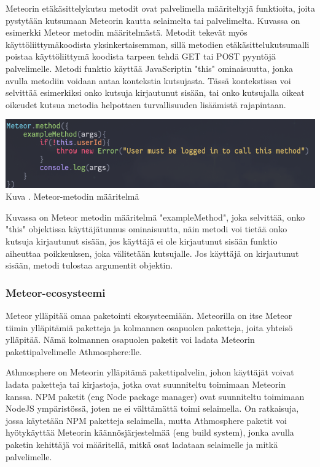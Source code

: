 Meteorin etäkäsittelykutsu metodit ovat palvelimella määriteltyjä funktioita, joita pystytään kutsumaan Meteorin kautta selaimelta tai palvelimelta. 
Kuvassa \nextImageCount{} on esimerkki Meteor metodin määritelmästä.
Metodit tekevät myös käyttöliittymäkoodista yksinkertaisemman, 
sillä metodien etäkäsittelukutsumalli poistaa käyttöliittymä koodista tarpeen tehdä GET tai POST pyyntöjä palvelimelle.
Metodi funktio käyttää JavaScriptin "this"{} ominaisuutta, jonka
avulla metodiin voidaan antaa kontekstia kutsujasta.
Tässä kontekstissa voi selvittää esimerkiksi onko kutsuja kirjautunut sisään, tai onko kutsujalla oikeat oikeudet kutsua metodia helpottaen turvallisuuden lisäämistä rajapintaan.
\bigskip

\includegraphics[width=15cm]{src/public/methodexample.png}\\
Kuva \getImgCount {}. Meteor-metodin määritelmä
\medskip

Kuvassa on Meteor metodin määritelmä "exampleMethod"{}, joka selvittää, onko "this"{} objektissa käyttäjätunnus ominaisuutta, 
näin metodi voi tietää onko kutsuja kirjautunut sisään,
jos käyttäjä ei ole kirjautunut sisään funktio aiheuttaa poikkeuksen, joka välitetään kutsujalle.
Jos käyttäjä on kirjautunut sisään, metodi tulostaa argumentit objektin. 
\medskip




\subsubsection{Meteor-ecosysteemi}



Meteor ylläpitää omaa paketointi ekosysteemiään. 
Meteorilla on itse Meteor tiimin ylläpitämiä paketteja ja kolmannen osapuolen paketteja,
joita yhteisö ylläpitää. Nämä kolmannen osapuolen paketit voi ladata Meteorin pakettipalvelimelle Athmosphere:lle.\\
\medskip


Athmosphere on Meteorin ylläpitämä pakettipalvelin, johon käyttäjät voivat ladata paketteja tai kirjastoja,
jotka ovat suunniteltu toimimaan Meteorin kanssa.
NPM paketit (eng Node package manager) ovat suunniteltu toimimaan NodeJS ympäristössä, joten ne ei välttämättä toimi selaimella.
On ratkaisuja, jossa käytetään NPM paketteja selaimella, mutta
Athmosphere paketit voi hyötykäyttää Meteorin käännösjärjestelmää (eng build system),
jonka avulla paketin kehittäjä voi määritellä, mitkä osat ladataan selaimelle ja mitkä palvelimelle.

